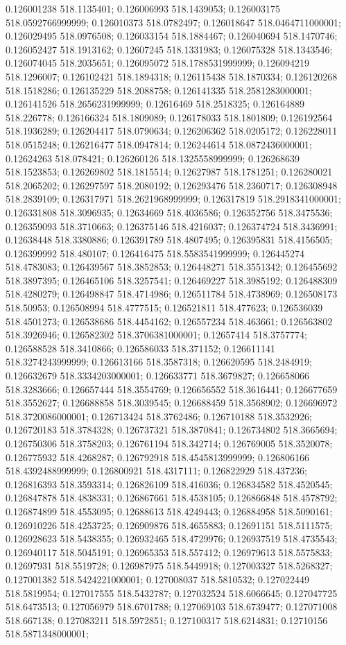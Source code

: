 0.126001238 518.1135401; 0.126006993 518.1439053; 0.126003175 518.0592766999999; 0.126010373 518.0782497; 0.126018647 518.0464711000001; 0.126029495 518.0976508; 0.126033154 518.1884467; 0.126040694 518.1470746; 0.126052427 518.1913162; 0.12607245 518.1331983; 0.126075328 518.1343546; 0.126074045 518.2035651; 0.126095072 518.1788531999999; 0.126094219 518.1296007; 0.126102421 518.1894318; 0.126115438 518.1870334; 0.126120268 518.1518286; 0.126135229 518.2088758; 0.126141335 518.2581283000001; 0.126141526 518.2656231999999; 0.12616469 518.2518325; 0.126164889 518.226778; 0.126166324 518.1809089; 0.126178033 518.1801809; 0.126192564 518.1936289; 0.126204417 518.0790634; 0.126206362 518.0205172; 0.126228011 518.0515248; 0.126216477 518.0947814; 0.126244614 518.0872436000001; 0.12624263 518.078421; 0.126260126 518.1325558999999; 0.126268639 518.1523853; 0.126269802 518.1815514; 0.12627987 518.1781251; 0.126280021 518.2065202; 0.126297597 518.2080192; 0.126293476 518.2360717; 0.126308948 518.2839109; 0.126317971 518.2621968999999; 0.126317819 518.2918341000001; 0.126331808 518.3096935; 0.12634669 518.4036586; 0.126352756 518.3475536; 0.126359093 518.3710663; 0.126375146 518.4216037; 0.126374724 518.3436991; 0.12638448 518.3380886; 0.126391789 518.4807495; 0.126395831 518.4156505; 0.126399992 518.480107; 0.126416475 518.5583541999999; 0.126445274 518.4783083; 0.126439567 518.3852853; 0.126448271 518.3551342; 0.126455692 518.3897395; 0.126465106 518.3257541; 0.126469227 518.3985192; 0.126488309 518.4280279; 0.126498847 518.4714986; 0.126511784 518.4738969; 0.126508173 518.50953; 0.126508994 518.4777515; 0.126521811 518.477623; 0.126536039 518.4501273; 0.126538686 518.4454162; 0.126557234 518.463661; 0.126563802 518.3926946; 0.126582302 518.3706381000001; 0.12657414 518.3757774; 0.126588528 518.3410866; 0.126586033 518.371152; 0.126611141 518.3274243999999; 0.126613166 518.3587318; 0.126620595 518.2484919; 0.126632679 518.3334203000001; 0.126633771 518.3679827; 0.126658066 518.3283666; 0.126657444 518.3554769; 0.126656552 518.3616441; 0.126677659 518.3552627; 0.126688858 518.3039545; 0.126688459 518.3568902; 0.126696972 518.3720086000001; 0.126713424 518.3762486; 0.126710188 518.3532926; 0.126720183 518.3784328; 0.126737321 518.3870841; 0.126734802 518.3665694; 0.126750306 518.3758203; 0.126761194 518.342714; 0.126769005 518.3520078; 0.126775932 518.4268287; 0.126792918 518.4545813999999; 0.126806166 518.4392488999999; 0.126800921 518.4317111; 0.126822929 518.437236; 0.126816393 518.3593314; 0.126826109 518.416036; 0.126834582 518.4520545; 0.126847878 518.4838331; 0.126867661 518.4538105; 0.126866848 518.4578792; 0.126874899 518.4553095; 0.12688613 518.4249443; 0.126884958 518.5090161; 0.126910226 518.4253725; 0.126909876 518.4655883; 0.12691151 518.5111575; 0.126928623 518.5438355; 0.126932465 518.4729976; 0.126937519 518.4735543; 0.126940117 518.5045191; 0.126965353 518.557412; 0.126979613 518.5575833; 0.12697931 518.5519728; 0.126987975 518.5449918; 0.127003327 518.5268327; 0.127001382 518.5424221000001; 0.127008037 518.5810532; 0.127022449 518.5819954; 0.127017555 518.5432787; 0.127032524 518.6066645; 0.127047725 518.6473513; 0.127056979 518.6701788; 0.127069103 518.6739477; 0.127071008 518.667138; 0.127083211 518.5972851; 0.127100317 518.6214831; 0.12710156 518.5871348000001; 